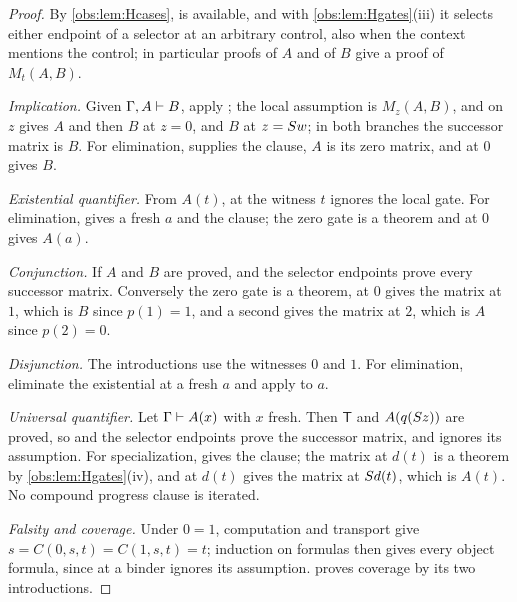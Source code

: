 \begin{proof}
By \cref{obs:lem:Hcases},  is available, and with
\cref{obs:lem:Hgates}(iii) it selects either endpoint of a selector at an
arbitrary control, also when the context mentions the control; in particular
proofs of $A$ and of $B$ give a proof of $M_t(A,B)$.

\emph{Implication.} Given $\Gamma,A\vdash B$, apply ; the local
assumption is $M_z(A,B)$, and  on $z$ gives $A$ and then $B$ at
$z=0$, and $B$ at $z=S w$; in both branches the successor matrix is $B$. For
elimination,  supplies the clause, $A$ is its zero matrix, and
 at $0$ gives $B$.

\emph{Existential quantifier.} From $A(t)$,  at the witness $t$
ignores the local gate. For elimination,  gives a fresh $a$ and
the clause; the zero gate is a theorem and  at $0$ gives
$A(a)$.

\emph{Conjunction.} If $A$ and $B$ are proved,  and the
selector endpoints prove every successor matrix. Conversely the zero gate is a
theorem,  at $0$ gives the matrix at $1$, which is $B$ since
$p(1)=1$, and a second  gives the matrix at $2$, which is $A$
since $p(2)=0$.

\emph{Disjunction.} The introductions use the witnesses $0$ and $1$. For
elimination, eliminate the existential at a fresh $a$ and apply
 to $a$.

\emph{Universal quantifier.} Let $\Gamma\vdash A(x)$ with $x$ fresh. Then
$\mathsf{T}$ and $A(q(S z))$ are proved, so  and the
selector endpoints prove the successor matrix, and  ignores its
assumption. For specialization,  gives the clause; the matrix at
$d(t)$ is a theorem by \cref{obs:lem:Hgates}(iv), and  at
$d(t)$ gives the matrix at $S d(t)$, which is $A(t)$. No compound progress
clause is iterated.

\emph{Falsity and coverage.} Under $0=1$, computation and transport give
$s=C(0,s,t)=C(1,s,t)=t$; induction on formulas then gives every object formula,
since at a binder  ignores its assumption.  proves
coverage by its two introductions.
\end{proof}

